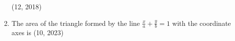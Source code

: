 \begin{enumerate}[label=\thesubsection.\arabic*, ref=\thesubsection.\theenumi]
\hfill (12, 2018) 
    \item The area of the triangle formed by the line $ \frac{x}{a} + \frac{y}{b} = 1 $ with the coordinate axes is 
    \hfill (10, 2023)
\end{enumerate}
